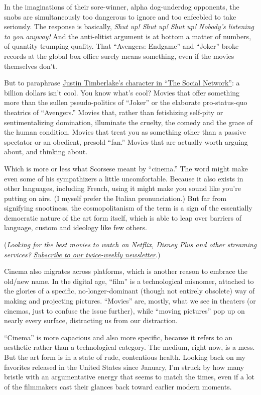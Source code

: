 In the imaginations of their sore-winner, alpha dog-underdog opponents,
the snobs are simultaneously too dangerous to ignore and too enfeebled
to take seriously. The response is basically, \emph{Shut up! Shut up!
Shut up! Nobody's listening to you anyway!} And the anti-elitist
argument is at bottom a matter of numbers, of quantity trumping quality.
That ``Avengers: Endgame'' and ``Joker'' broke records at the global box
office surely means something, even if the movies themselves don't.

But to paraphrase
\href{https://www.youtube.com/watch?v=k5fJmkv02is}{Justin Timberlake's
character in ``The Social Network''}: a billion dollars isn't cool. You
know what's cool? Movies that offer something more than the sullen
pseudo-politics of ``Joker'' or the elaborate pro-status-quo theatrics
of ``Avengers.'' Movies that, rather than fetishizing self-pity or
sentimentalizing domination, illuminate the cruelty, the comedy and the
grace of the human condition. Movies that treat you as something other
than a passive spectator or an obedient, presold ``fan.'' Movies that
are actually worth arguing about, and thinking about.

Which is more or less what Scorsese meant by ``cinema.'' The word might
make even some of his sympathizers a little uncomfortable. Because it
also exists in other languages, including French, using it might make
you sound like you're putting on airs. (I myself prefer the Italian
pronunciation.) But far from signifying snootiness, the cosmopolitanism
of the term is a sign of the essentially democratic nature of the art
form itself, which is able to leap over barriers of language, custom and
ideology like few others.

(\emph{Looking for the best movies to watch on Netflix, Disney Plus and
other streaming services?}
\href{https://www.nytimes.com/newsletters/watching}{\emph{Subscribe to
our twice-weekly newsletter}}.)

Cinema also migrates across platforms, which is another reason to
embrace the old/new name. In the digital age, ``film'' is a
technological misnomer, attached to the glories of a specific,
no-longer-dominant (though not entirely obsolete) way of making and
projecting pictures. ``Movies'' are, mostly, what we see in theaters (or
cinemas, just to confuse the issue further), while ``moving pictures''
pop up on nearly every surface, distracting us from our distraction.

``Cinema'' is more capacious and also more specific, because it refers
to an aesthetic rather than a technological category. The medium, right
now, is a mess. But the art form is in a state of rude, contentious
health. Looking back on my favorites released in the United States since
January, I'm struck by how many bristle with an argumentative energy
that seems to match the times, even if a lot of the filmmakers cast
their glances back toward earlier modern moments.

